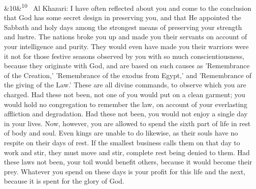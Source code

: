 \documentclass[12pt]{article}
\newcommand{\para}[1][]{\par\noindent\ifx&#1&\else\textsuperscript{\footnotesize #1}~\fi}
\begin{document}
\para[10] Al Khazari: I have often reflected about you and come to the conclusion that God has some secret design in preserving you, and that He appointed the Sabbath and holy days among the strongest means of preserving your strength and lustre. The nations broke you up and made you their servants on account of your intelligence and purity. They would even have made you their warriors were it not for those festive seasons observed by you with so much conscientiousness, because they originate with God, and are based on such causes as 'Remembrance of the Creation,' 'Remembrance of the exodus from Egypt,' and 'Remembrance of the giving of the Law.' These are all divine commands, to observe which you are charged. Had these not been, not one of you would put on a clean garment; you would hold no congregation to remember the law, on account of your everlasting affliction and degradation. Had these not been, you would not enjoy a single day in your lives. Now, however, you are allowed to spend the sixth part of life in rest of body and soul. Even kings are unable to do likewise, as their souls have no respite on their days of rest. If the smallest business calls them on that day to work and stir, they must move and stir, complete rest being denied to them. Had these laws not been, your toil would benefit others, because it would become their prey. Whatever you spend on these days is your profit for this life and the next, because it is spent for the glory of God.
\end{document}
